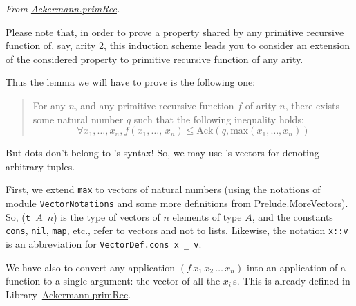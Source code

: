 \vspace{4pt}
\noindent
\emph{From \href{../theories/html/hydras.Ackermann.primRec.html}{Ackermann.primRec}.}


 



Please note that, in order to prove a property shared by any primitive recursive function of, say, arity 2, this induction scheme  leads you to consider an extension of the considered property to primitive recursive function of any arity.

Thus the lemma we will have to prove is the following one:


  \begin{quote}
    For any $n$, and any primitive recursive function $f$ of  arity $n$, there exists some natural number $q$ such that the following inequality holds:
 \[
  \forall x_1,\dots,x_n, 
      f(x_1,\dots,\,x_n)\leq\textrm{Ack}(q,\textrm{max}(x_1,\dots,x_n))
\]
 \end{quote}


But dots don't belong to \gallina's syntax! So, we may use \coq's vectors for denoting arbitrary tuples.

First, we extend \texttt{max} to vectors of natural numbers (using the notations of module \texttt{VectorNotations} and some more definitions from 
\href{../theories/html/hydras.Prelude.MoreVectors.html}{Prelude.MoreVectors}). So, (\texttt{t\,$A$\,$n$}) is the type of vectors of $n$ elements of type $A$, and the constants \texttt{cons}, \texttt{nil}, \texttt{map}, etc., refer to vectors and not to lists. Likewise, the notation \texttt{x::v} is an abbreviation for
\texttt{VectorDef.cons x \_ v}.











We have also to convert any application
$(f\,x_1\,x_2\,\dots\,x_n)$ into an application of a function 
to a single argument: the vector of all the $x_i$\,s.
This is already defined in 
Library~\href{../theories/html/hydras.Ackermann.primRec.html}{Ackermann.primRec}.


